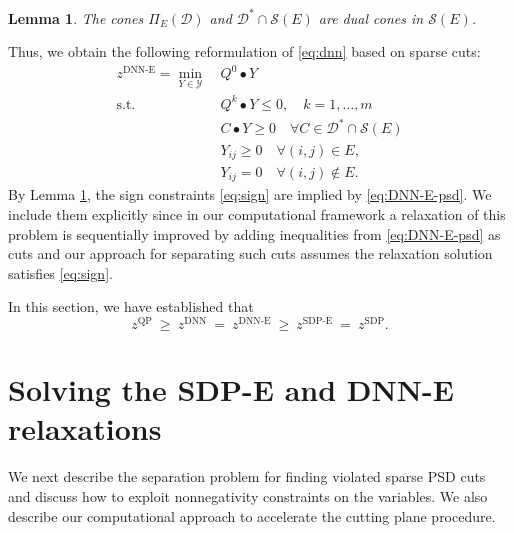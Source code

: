 \documentclass[twoside]{article}
\newtheorem{lemma}[thm]{Lemma}
\newcommand{\oo}[1]{{\textcolor{blue}{#1}}}
\newcommand{\ooc}[1]{{ \oo{[OG comment: #1}]}}
\newcommand{\jim}[1]{{ \oo{[Jim comment: #1}]}}
\newcommand{\matip}[2]{#1 \bullet #2}
\begin{document}
		\begin{lemma}
			\label{thm:proj-dnn}
			The cones $\Pi_E(\mathcal{D})$ and $\mathcal{D}^* \cap \mathcal{S}(E)$ are dual cones in $\mathcal{S}(E)$. 
		\end{lemma}
		
		Thus, we obtain the following reformulation of \eqref{eq:dnn} based on sparse cuts:
		\begin{subequations}
			\label{eq:DNN-E}
			\begin{align}
				z^{\text{DNN-E}}=\min_{Y \in \mathcal{Y}} \ & \matip{Q^0}{Y} \\
				\text{s.t. } & \matip{Q^k}{Y}  \leq 0,  \quad k=1,\ldots, m \label{sdpe2-lin}\\
				& \matip{C}{Y} \geq 0 \quad \forall C \in \mathcal{D}^* \cap \mathcal{S}(E) \label{eq:DNN-E-psd} \\
				& Y_{ij} \geq 0 \quad \forall (i,j) \in E, \label{eq:sign} \\
				& Y_{ij} = 0 \quad \forall (i,j) \notin E.
		\end{align}\end{subequations}
		By Lemma \ref{thm:proj-dnn}, the sign constraints \eqref{eq:sign} are implied by \eqref{eq:DNN-E-psd}.  We include them explicitly since in our computational framework a relaxation of this problem is sequentially improved by adding inequalities from \eqref{eq:DNN-E-psd} as cuts and our approach for separating such cuts assumes the relaxation solution satisfies \eqref{eq:sign}.
		
		In this section, we have established that 
		$$z^{\text{QP}} ~\ge~z^{\text{DNN}}~=~z^{\text{DNN-E}}~\ge~z^{\text{SDP-E}}~=~ z^{\text{SDP}}.\label{eq:rev_ineq}$$
		
		
		
		
		
		\section{Solving the SDP-E and DNN-E relaxations}%
	\label{sec:separation}
	We next describe the separation problem for finding violated sparse PSD cuts and discuss how to exploit nonnegativity constraints on the variables. We also describe our computational approach to accelerate the cutting plane procedure.
	
\end{document}
